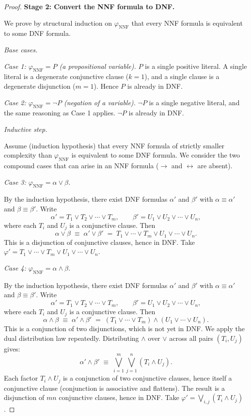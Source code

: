 \begin{proof}
\medskip
\noindent\textbf{Stage 2: Convert the NNF formula to DNF.}

We prove by structural induction on $\varphi_{\mathrm{NNF}}$ that every NNF
formula is equivalent to some DNF formula.

\medskip
\noindent\textit{Base cases.}

\medskip
\textit{Case 1: $\varphi_{\mathrm{NNF}} = P$ (a propositional variable).}
$P$ is a single positive literal. A single literal is a degenerate conjunctive
clause ($k = 1$), and a single clause is a degenerate disjunction ($m = 1$).
Hence $P$ is already in DNF.

\medskip
\textit{Case 2: $\varphi_{\mathrm{NNF}} = \neg P$ (negation of a variable).}
$\neg P$ is a single negative literal, and the same reasoning as Case 1 applies.
$\neg P$ is already in DNF.

\medskip
\noindent\textit{Inductive step.}

Assume (induction hypothesis) that every NNF formula of strictly smaller
complexity than $\varphi_{\mathrm{NNF}}$ is equivalent to some DNF formula. We
consider the two compound cases that can arise in an NNF formula ($\rightarrow$
and $\leftrightarrow$ are absent).

\medskip
\textit{Case 3: $\varphi_{\mathrm{NNF}} = \alpha \vee \beta$.}

By the induction hypothesis, there exist DNF formulas $\alpha'$ and $\beta'$
with $\alpha \equiv \alpha'$ and $\beta \equiv \beta'$. Write
\[
    \alpha' = T_1 \vee T_2 \vee \cdots \vee T_m, \qquad
    \beta'  = U_1 \vee U_2 \vee \cdots \vee U_n,
\]
where each $T_i$ and $U_j$ is a conjunctive clause. Then
\[
    \alpha \vee \beta \;\equiv\; \alpha' \vee \beta'
    \;=\; T_1 \vee \cdots \vee T_m \vee U_1 \vee \cdots \vee U_n.
\]
This is a disjunction of conjunctive clauses, hence in DNF. Take $\varphi' =
T_1 \vee \cdots \vee T_m \vee U_1 \vee \cdots \vee U_n$.

\medskip
\textit{Case 4: $\varphi_{\mathrm{NNF}} = \alpha \wedge \beta$.}

By the induction hypothesis, there exist DNF formulas $\alpha'$ and $\beta'$
with $\alpha \equiv \alpha'$ and $\beta \equiv \beta'$. Write
\[
    \alpha' = T_1 \vee T_2 \vee \cdots \vee T_m, \qquad
    \beta'  = U_1 \vee U_2 \vee \cdots \vee U_n,
\]
where each $T_i$ and $U_j$ is a conjunctive clause. Then
\[
    \alpha \wedge \beta \;\equiv\; \alpha' \wedge \beta'
    \;=\; (T_1 \vee \cdots \vee T_m) \wedge (U_1 \vee \cdots \vee U_n).
\]
This is a conjunction of two disjunctions, which is not yet in DNF. We apply
the dual distribution law repeatedly. Distributing $\wedge$ over $\vee$ across
all pairs $(T_i, U_j)$ gives:
\[
    \alpha' \wedge \beta' \;\equiv\;
    \bigvee_{i=1}^{m} \bigvee_{j=1}^{n} (T_i \wedge U_j).
\]
Each factor $T_i \wedge U_j$ is a conjunction of two conjunctive clauses, hence
itself a conjunctive clause (conjunction is associative and flattens). The
result is a disjunction of $mn$ conjunctive clauses, hence in DNF. Take
$\varphi' = \bigvee_{i,j}(T_i \wedge U_j)$.


\end{proof}
